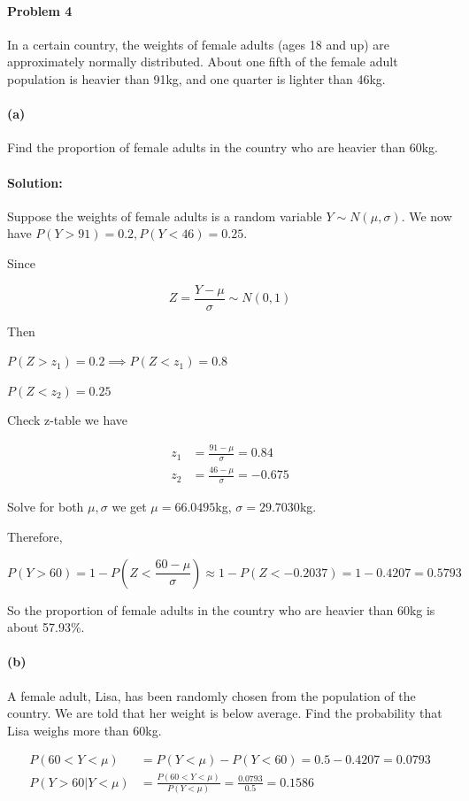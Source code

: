 \documentclass[a4paper, 11pt, twoside]{article}
\begin{document}
\paragraph{Problem 4} In a certain country, the weights of female adults (ages 18 and up) are approximately normally distributed. About one fifth of the female adult population is heavier than 91kg, and one quarter is lighter than 46kg.

\paragraph{(a)} Find the proportion of female adults in the country who are heavier than 60kg.

\paragraph{Solution:} Suppose the weights of female adults is a random variable $Y\sim N(\mu, \sigma)$. We now have $P(Y>91)=0.2, P(Y<46)=0.25$.

Since 

\[Z=\frac{Y-\mu}{\sigma}\sim N(0,1)\]

Then 

$P(Z > z_1)=0.2 \implies P(Z<z_1)=0.8$

$P(Z < z_2)=0.25$

Check z-table we have

\[
\begin{split}
	z_1&=\frac{91-\mu}{\sigma}=0.84\\
	z_2&=\frac{46-\mu}{\sigma}=-0.675	
\end{split}
\]

Solve for both $\mu, \sigma$ we get $\mu=66.0495$kg, $\sigma=29.7030$kg.

Therefore, 

\[P(Y>60)= 1- P(Z < \frac{60-\mu}{\sigma})\approx 1-P(Z<-0.2037)= 1- 0.4207=0.5793\]

So the proportion of female adults in the country who are heavier than 60kg is about 57.93\%.

\paragraph{(b)} A female adult, Lisa, has been randomly chosen from the population of the country. We are told that her weight is below average. Find the probability that Lisa weighs more than 60kg.

\[
\begin{split}
	P(60<Y<\mu)&=P(Y<\mu)-P(Y<60)=0.5-0.4207=0.0793\\
	P(Y>60|Y<\mu)&=\frac{P(60<Y<\mu)}{P(Y<\mu)}=\frac{0.0793}{0.5}=0.1586
\end{split}
\]
\end{document}
